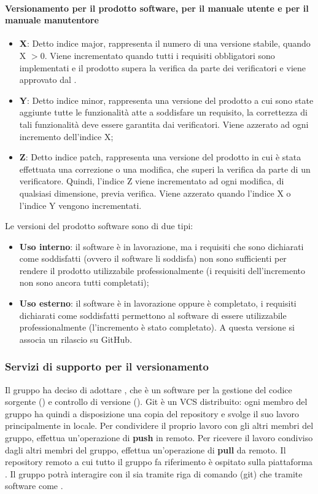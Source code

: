 \paragraph{Versionamento per il prodotto software, per il manuale utente e per il manuale manutentore}\hbox{}
\begin{itemize}
	\item \textbf{X}: Detto indice major, rappresenta il numero di una versione stabile, quando X $> 0$.
	Viene incrementato quando tutti i requisiti obbligatori sono implementati e il prodotto supera la verifica da parte dei verificatori e viene approvato dal \Responsabile{}.
	\item \textbf{Y}: Detto indice minor, rappresenta una versione del prodotto a cui sono state aggiunte tutte le funzionalità atte a soddisfare un requisito, la correttezza di tali funzionalità deve essere garantita dai verificatori.  
	Viene azzerato ad ogni incremento dell'indice X;
	\item \textbf{Z}: Detto indice patch, rappresenta una versione del prodotto in cui è stata effettuata una correzione o una modifica, che superi la verifica da parte di un verificatore.
	Quindi, l'indice Z viene incrementato ad ogni modifica, di qualsiasi dimensione, previa verifica.
	Viene azzerato quando l'indice X o l'indice Y vengono incrementati.
\end{itemize}
Le versioni del prodotto software sono di due tipi:
\begin{itemize}
	\item \textbf{Uso interno}: il software è in lavorazione, ma i requisiti che sono dichiarati come soddisfatti (ovvero il software li soddisfa) non sono sufficienti per rendere il prodotto utilizzabile professionalmente (i requisiti dell'incremento non sono ancora tutti completati);
	\item \textbf{Uso esterno}: il software è in lavorazione oppure è completato, i requisiti dichiarati come soddisfatti permettono al software di essere utilizzabile professionalmente (l'incremento è stato completato). A questa versione si associa un rilascio su GitHub.
\end{itemize}

\subsubsection{Servizi di supporto per il versionamento} 
Il gruppo ha deciso di adottare , che è un software per la gestione del codice sorgente () e controllo di versione ().
Git è un VCS distribuito: ogni membro del gruppo \Gruppo{} ha quindi a disposizione una copia del repository e svolge il suo lavoro principalmente in locale.
Per condividere il proprio lavoro con gli altri membri del gruppo, effettua un'operazione di \textbf{push} in remoto.
Per ricevere il lavoro condiviso dagli altri membri del gruppo, effettua un'operazione di \textbf{pull} da remoto.
Il repository remoto a cui tutto il gruppo fa riferimento è ospitato sulla piattaforma .
Il gruppo \Gruppo{} potrà interagire con il  sia tramite riga di comando (git) che tramite software come .

